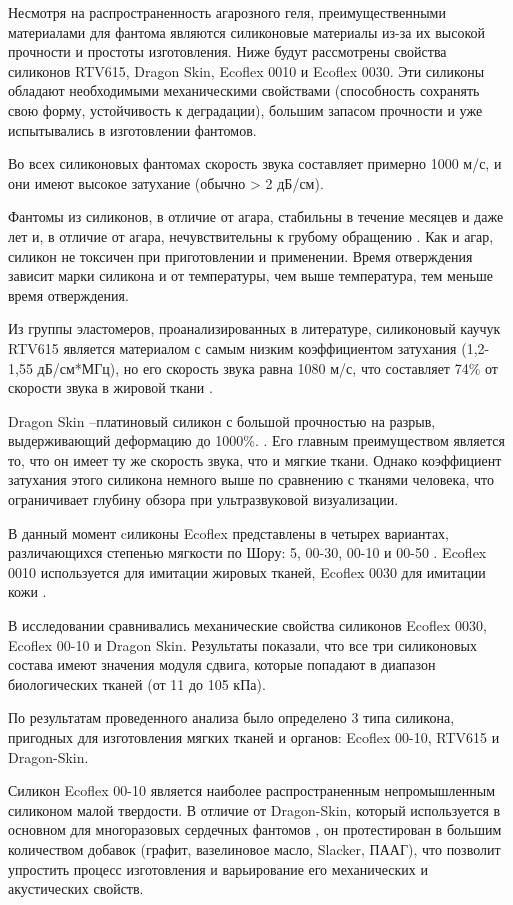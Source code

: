 Несмотря на распространенность агарозного геля, преимущественными материалами для фантома являются силиконовые материалы из-за их высокой прочности и простоты изготовления. Ниже будут рассмотрены свойства силиконов RTV615, Dragon Skin, Ecoflex 0010 и Ecoflex 0030. Эти силиконы обладают необходимыми механическими свойствами (способность сохранять свою форму, устойчивость к деградации), большим запасом прочности и уже испытывались в изготовлении фантомов.

Во всех силиконовых фантомах скорость звука составляет примерно 1000 м/с, и они имеют высокое затухание (обычно > 2 дБ/см). 

Фантомы из силиконов, в отличие от агара, стабильны в течение месяцев и даже лет и, в отличие от агара, нечувствительны к грубому обращению \cite{litlink56}. Как и агар, силикон не токсичен при приготовлении и применении. Время отверждения зависит марки силикона и от температуры, чем выше температура, тем меньше время отверждения. 

Из группы эластомеров, проанализированных в литературе, силиконовый каучук RTV615 является материалом с самым низким коэффициентом затухания (1,2-1,55 дБ/см*МГц), но его скорость звука равна 1080 м/с, что составляет 74\% от скорости звука в жировой ткани \cite{litlink46}. 

Dragon Skin –платиновый силикон с большой прочностью на разрыв, выдерживающий деформацию до 1000\%. \cite{litlink57}. Его главным преимуществом является то, что он имеет ту же скорость звука, что и мягкие ткани. Однако коэффициент затухания этого силикона немного выше по сравнению с тканями человека, что ограничивает глубину обзора при ультразвуковой визуализации.

В данный момент cиликоны Ecoflex представлены в четырех вариантах, различающихся степенью мягкости по Шору: 5, 00-30, 00-10 и 00-50 \cite{litlink58}. Ecoflex 0010 используется для имитации жировых тканей, Ecoflex 0030 для имитации кожи \cite{litlink59}. 

В исследовании \cite{litlink59} сравнивались механические свойства силиконов Ecoflex 0030, Ecoflex 00-10 и Dragon Skin. Результаты показали, что все три силиконовых состава имеют значения модуля сдвига, которые попадают в диапазон биологических тканей (от 11 до 105 кПа). 

По результатам проведенного анализа было определено 3 типа силикона, пригодных для изготовления мягких тканей и органов: Ecoflex 00-10, RTV615 и Dragon-Skin. 

Силикон Ecoflex 00-10 является наиболее распространенным непромышленным силиконом малой твердости. В отличие от Dragon-Skin, который используется в основном для многоразовых сердечных фантомов \cite{litlink60}, он протестирован в большим количеством добавок (графит, вазелиновое масло, Slacker, ПААГ), что позволит упростить процесс изготовления и варьирование его механических и акустических свойств.


